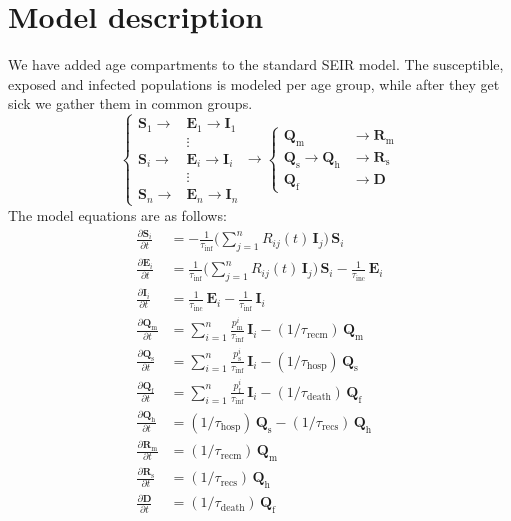 \documentclass[twoside,11pt]{article}
\newcommand{\Tinc}  {\tau_\textrm{inc}}
\newcommand{\Tinf}  {\tau_\textrm{inf}}
\newcommand{\Tdeath}{\tau_\textrm{death}}
\newcommand{\Trecm} {\tau_\textrm{recm}}
\newcommand{\Trecs} {\tau_\textrm{recs}}
\newcommand{\Thosp} {\tau_\textrm{hosp}}
\newcommand {\hpil}{\rightarrow}
\newcommand {\Dp}[2] {\frac{\partial #1}{\partial #2}}
\newcommand{\rmf}{\mathrm{f}}
\newcommand{\rmh}{\mathrm{h}}
\newcommand{\rmm}{\mathrm{m}}
\newcommand{\rms}{\mathrm{s}}
\newcommand{\bmD}{{\mathbf{D}}}
\newcommand{\bmE}{{\mathbf{E}}}
\newcommand{\bmI}{{\mathbf{I}}}
\newcommand{\bmQ}{{\mathbf{Q}}}
\newcommand{\bmR}{{\mathbf{R}}}
\newcommand{\bmS}{{\mathbf{S}}}
\begin{document}
\section{Model description}
We have added age compartments to the standard SEIR model. The susceptible, exposed and infected populations is modeled
per age group, while after they get sick we gather them in common groups.
%
\begin{equation}
\begin{cases}
\bmS_1  \hpil &\bmE_1 \hpil \bmI_1 \\
&\vdots \\
\bmS_i  \hpil &\bmE_i \hpil \bmI_i \\
&\vdots \\
\bmS_{n}  \hpil &\bmE_{n} \hpil \bmI_{n} 
\end{cases}
\hpil
\begin{cases}
\bmQ_\rmm                     &  \hpil \bmR_\rmm  \\
\bmQ_\rms    \hpil \bmQ_\rmh  &  \hpil \bmR_\rms  \\
\bmQ_\rmf                     &  \hpil \bmD
\end{cases}
\label{eq:}
\end{equation}
%
The model equations are as follows:
%
\begin{align}
\Dp{\bmS_i}{t}    &=   -\frac{1}{\Tinf} \bigg(\sum_{j=1}^n R_{ij}(t)\,\bmI_j\bigg) \, \bmS_i                           \label{eq:Si} \\
\Dp{\bmE_i}{t}    &=    \frac{1}{\Tinf} \bigg(\sum_{j=1}^n R_{ij}(t)\,\bmI_j\bigg) \, \bmS_i - \frac{1}{\Tinc}\, \bmE_i      \label{eq:Ei} \\
\Dp{\bmI_i}{t}    &=    \frac{1}{\Tinc}  \, \bmE_i          - \frac{1}{\Tinf}  \, \bmI_i                                     \label{eq:Ii} \\
\Dp{\bmQ_\rmm}{t} &=    \sum_{i=1}^n\frac{p_\rmm^i}{\Tinf} \, \bmI_i          - (1/\Trecm)  \, \bmQ_\rmm         \label{eq:Sm} \\
\Dp{\bmQ_\rms}{t} &=    \sum_{i=1}^n\frac{p_\rms^i}{\Tinf} \, \bmI_i          - (1/\Thosp)  \, \bmQ_\rms         \label{eq:Sh} \\
\Dp{\bmQ_\rmf}{t} &=    \sum_{i=1}^n\frac{p_\rmf^i}{\Tinf} \, \bmI_i          - (1/\Tdeath) \, \bmQ_\rmf          \label{eq:Sdead} \\
\Dp{\bmQ_\rmh}{t} &=    (1/\Thosp)     \, \bmQ_\rms     - (1/\Trecs)  \, \bmQ_\rmh         \label{eq:Shos} \\
\Dp{\bmR_\rmm }{t}&=    (1/\Trecm)     \, \bmQ_\rmm                                        \label{eq:Rm} \\
\Dp{\bmR_\rms}{t} &=    (1/\Trecs)     \, \bmQ_\rmh                                        \label{eq:E} \\
\Dp{\bmD     }{t} &=    (1/\Tdeath)    \, \bmQ_\rmf                                        \label{eq:E} 
\end{align}
\end{document}

